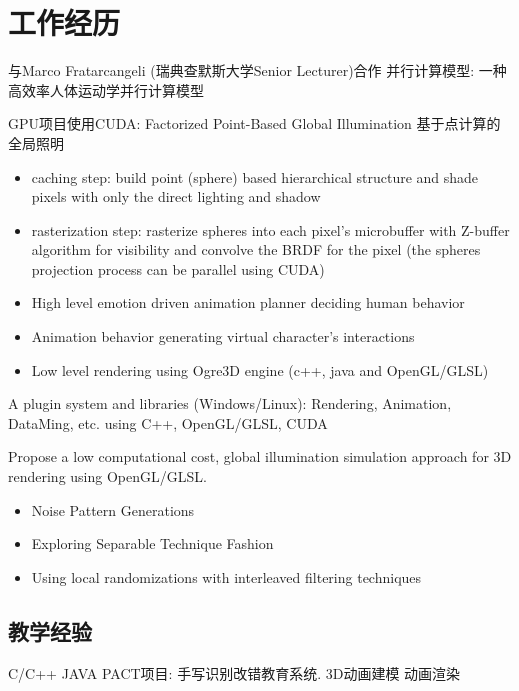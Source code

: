 \section{工作经历}
{
与Marco Fratarcangeli (瑞典查默斯大学Senior Lecturer)合作
并行计算模型: 一种高效率人体运动学并行计算模型
}
{
GPU项目使用CUDA: Factorized Point-Based Global Illumination  基于点计算的全局照明
\begin{itemize}
	\item caching step: build point (sphere) based hierarchical structure and shade pixels with only the direct lighting and shadow
	\item rasterization step: rasterize spheres into each pixel's microbuffer with Z-buffer algorithm for visibility and convolve the BRDF for the pixel (the spheres projection process can be parallel using CUDA)
\end{itemize}
}

{
\begin{itemize}
\item High level emotion driven animation planner deciding human behavior
\item Animation behavior generating virtual character's interactions
\item Low level rendering using Ogre3D engine (c++, java and OpenGL/GLSL)
\end{itemize}
}

{
A plugin system and libraries (Windows/Linux): Rendering, Animation, DataMing, etc.
using C++, OpenGL/GLSL, CUDA
}

{
Propose a low computational cost, global illumination simulation approach for 3D rendering using OpenGL/GLSL.
\begin{itemize}
\item Noise Pattern Generations
\item Exploring Separable Technique Fashion
\item Using local randomizations with interleaved filtering techniques
\end{itemize}
}

\subsection{教学经验}
{
C/C++
}
{
JAVA
}
{
PACT项目: 手写识别改错教育系统.
}
{
3D动画建模
}
{
动画渲染
}

